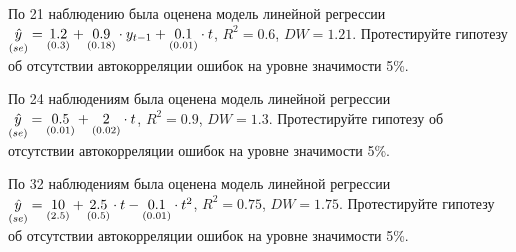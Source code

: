 \begin{problem}
По 21 наблюдению была оценена модель линейной регрессии
$\underset{(se)}{\hat{y}}=\underset{(0.3)}{1.2}+\underset{(0.18)}{0.9}\cdot y_{t-1}+\underset{(0.01)}{0.1}\cdot t$, $R^2=0.6$, $DW=1.21$. Протестируйте гипотезу об отсутствии автокорреляции ошибок на уровне значимости 5\%.


\begin{sol}
\end{sol}
\end{problem}




\begin{problem}
По 24 наблюдениям была оценена модель линейной регрессии
$\underset{(se)}{\hat{y}}=\underset{(0.01)}{0.5}+\underset{(0.02)}{2}\cdot t$, $R^2=0.9$, $DW=1.3$. Протестируйте гипотезу об отсутствии автокорреляции ошибок на уровне значимости 5\%.


\begin{sol}
\end{sol}
\end{problem}



\begin{problem}
По 32 наблюдениям была оценена модель линейной регрессии
$\underset{(se)}{\hat{y}}=\underset{(2.5)}{10}+\underset{(0.5)}{2.5}\cdot t- \underset{(0.01)}{0.1}\cdot t^2$, $R^2=0.75$, $DW=1.75$. 
Протестируйте гипотезу об отсутствии автокорреляции ошибок на уровне значимости 5\%.


\begin{sol}
\end{sol}
\end{problem}



